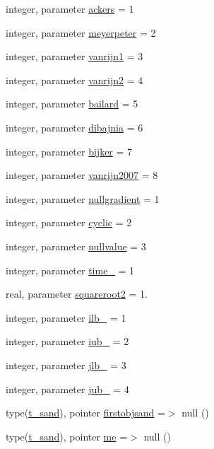 \begin{DoxyCompactItemize}
\item 
integer, parameter \mbox{\hyperlink{namespacemodulesand_ab78f3607e7926e591afd7524d7cb1891}{ackers}} = 1
\item 
integer, parameter \mbox{\hyperlink{namespacemodulesand_a053c30ed1ae972fb1e01367675decc64}{meyerpeter}} = 2
\item 
integer, parameter \mbox{\hyperlink{namespacemodulesand_a91ae2ce97b3ed9a46c5eb0811580a899}{vanrijn1}} = 3
\item 
integer, parameter \mbox{\hyperlink{namespacemodulesand_aadb60a7e8806a7d70ffe843a7140ddc2}{vanrijn2}} = 4
\item 
integer, parameter \mbox{\hyperlink{namespacemodulesand_a61791e89c9f7920fbec5dcb046279262}{bailard}} = 5
\item 
integer, parameter \mbox{\hyperlink{namespacemodulesand_a829fcd6465e28c43cfded2f7ed078b6c}{dibajnia}} = 6
\item 
integer, parameter \mbox{\hyperlink{namespacemodulesand_a7f909841ec9f34d3b540064f79084645}{bijker}} = 7
\item 
integer, parameter \mbox{\hyperlink{namespacemodulesand_ab870b94e2724314292f18ebbcf8d8d0a}{vanrijn2007}} = 8
\item 
integer, parameter \mbox{\hyperlink{namespacemodulesand_abb6fa7717ade586389b90162caae3aa9}{nullgradient}} = 1
\item 
integer, parameter \mbox{\hyperlink{namespacemodulesand_a0b207723c37f0efc8b12043e94a6f21b}{cyclic}} = 2
\item 
integer, parameter \mbox{\hyperlink{namespacemodulesand_a0c099220a63fd7427dd63f16b51a866d}{nullvalue}} = 3
\item 
integer, parameter \mbox{\hyperlink{namespacemodulesand_a095588b75f39deb69ac7615621940dc5}{time\+\_\+}} = 1
\item 
real, parameter \mbox{\hyperlink{namespacemodulesand_af3f2352f8b39963002c2f498e19d33dd}{squareroot2}} = 1.
\item 
integer, parameter \mbox{\hyperlink{namespacemodulesand_a361c6d30b64508e32b2c72304c92c23a}{ilb\+\_\+}} = 1
\item 
integer, parameter \mbox{\hyperlink{namespacemodulesand_a0a47996e544a44541a8bdcab9d38a618}{iub\+\_\+}} = 2
\item 
integer, parameter \mbox{\hyperlink{namespacemodulesand_aee51e6f004be2efd882579a87b57a18a}{jlb\+\_\+}} = 3
\item 
integer, parameter \mbox{\hyperlink{namespacemodulesand_a64ac30037fd7a221834343e8d4affa61}{jub\+\_\+}} = 4
\item 
type(\mbox{\hyperlink{structmodulesand_1_1t__sand}{t\+\_\+sand}}), pointer \mbox{\hyperlink{namespacemodulesand_a7851dcaac94d974f7dde72bc2e32cb6f}{firstobjsand}} =$>$ null ()
\item 
type(\mbox{\hyperlink{structmodulesand_1_1t__sand}{t\+\_\+sand}}), pointer \mbox{\hyperlink{namespacemodulesand_a8a3859b7501b07ac6835ae78e6a9d150}{me}} =$>$ null ()
\end{DoxyCompactItemize}


